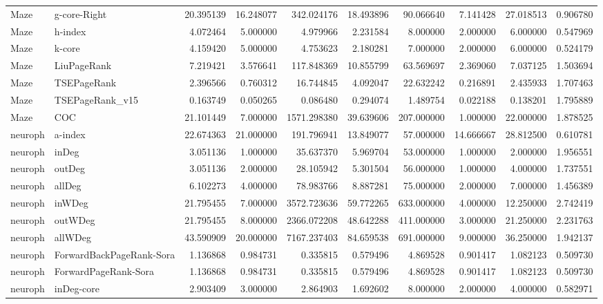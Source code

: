 \begin{tabular}{llrrrrrrrr}
Maze & g-core-Right & 20.395139 & 16.248077 & 342.024176 & 18.493896 & 90.066640 & 7.141428 & 27.018513 & 0.906780 \\
Maze & h-index & 4.072464 & 5.000000 & 4.979966 & 2.231584 & 8.000000 & 2.000000 & 6.000000 & 0.547969 \\
Maze & k-core & 4.159420 & 5.000000 & 4.753623 & 2.180281 & 7.000000 & 2.000000 & 6.000000 & 0.524179 \\
Maze & LiuPageRank & 7.219421 & 3.576641 & 117.848369 & 10.855799 & 63.569697 & 2.369060 & 7.037125 & 1.503694 \\
Maze & TSEPageRank & 2.396566 & 0.760312 & 16.744845 & 4.092047 & 22.632242 & 0.216891 & 2.435933 & 1.707463 \\
Maze & TSEPageRank_v15 & 0.163749 & 0.050265 & 0.086480 & 0.294074 & 1.489754 & 0.022188 & 0.138201 & 1.795889 \\
Maze & COC & 21.101449 & 7.000000 & 1571.298380 & 39.639606 & 207.000000 & 1.000000 & 22.000000 & 1.878525 \\
neuroph & a-index & 22.674363 & 21.000000 & 191.796941 & 13.849077 & 57.000000 & 14.666667 & 28.812500 & 0.610781 \\
neuroph & inDeg & 3.051136 & 1.000000 & 35.637370 & 5.969704 & 53.000000 & 1.000000 & 2.000000 & 1.956551 \\
neuroph & outDeg & 3.051136 & 2.000000 & 28.105942 & 5.301504 & 56.000000 & 1.000000 & 4.000000 & 1.737551 \\
neuroph & allDeg & 6.102273 & 4.000000 & 78.983766 & 8.887281 & 75.000000 & 2.000000 & 7.000000 & 1.456389 \\
neuroph & inWDeg & 21.795455 & 7.000000 & 3572.723636 & 59.772265 & 633.000000 & 4.000000 & 12.250000 & 2.742419 \\
neuroph & outWDeg & 21.795455 & 8.000000 & 2366.072208 & 48.642288 & 411.000000 & 3.000000 & 21.250000 & 2.231763 \\
neuroph & allWDeg & 43.590909 & 20.000000 & 7167.237403 & 84.659538 & 691.000000 & 9.000000 & 36.250000 & 1.942137 \\
neuroph & ForwardBackPageRank-Sora & 1.136868 & 0.984731 & 0.335815 & 0.579496 & 4.869528 & 0.901417 & 1.082123 & 0.509730 \\
neuroph & ForwardPageRank-Sora & 1.136868 & 0.984731 & 0.335815 & 0.579496 & 4.869528 & 0.901417 & 1.082123 & 0.509730 \\
neuroph & inDeg-core & 2.903409 & 3.000000 & 2.864903 & 1.692602 & 8.000000 & 2.000000 & 4.000000 & 0.582971 \\

\end{tabular}
